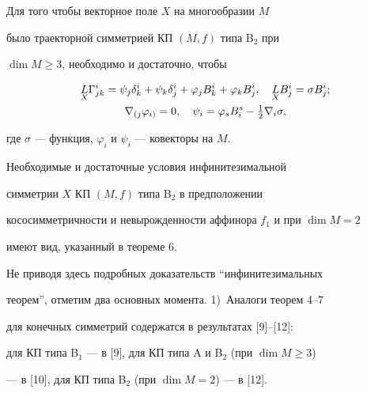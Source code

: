  


\begin{thm} 


Для того чтобы векторное поле $X$ на многообразии $M$ 


было траекторной симметрией КП $(M,f)$ типа $\mathrm B_2$ при 


$\dim M\ge 3$, необходимо и достаточно, чтобы 


\begin{gather*} 


\down{X}{L}\Gamma^i_{j k}=\psi_j\delta^i_k+\psi_k\delta^i_j+ 


\varphi_j B^i_k+\varphi_k B^i_j,\quad 


\down{X}{L}B^i_j=\sigma B^i_j;\\ 


% 


\nabla_{(j}\varphi_{i)}=0,\quad 


\psi_i=\varphi_s B^s_i-\tfrac{1}{2}\nabla_i\sigma, 


\end{gather*} 


где $\sigma$ --- функция, $\varphi_i$ и $\psi_i$ --- ковекторы на $M$. 


\end{thm} 


 


\begin{thm} 


Необходимые и достаточные условия инфинитезимальной 


симметрии $X$ КП $(M,f)$ типа $\mathrm B_2$ в предположении 


кососимметричности и невырожденности аффинора $f_1$ и при $\dim M=2$ 


имеют вид, указанный в теореме $6$. 


\end{thm} 


 


Не приводя здесь подробных доказательств ``инфинитезимальных 


теорем'', отметим два основных момента. 1)~Аналоги теорем 4--7 


для конечных симметрий содержатся в результатах [9]--[12]: 


для КП типа B$_1$ --- в [9], для КП типа A и B$_2$ (при $\dim M\ge3$) 


--- в [10], для КП типа B$_2$ (при $\dim M=2$) --- в [12]. 


